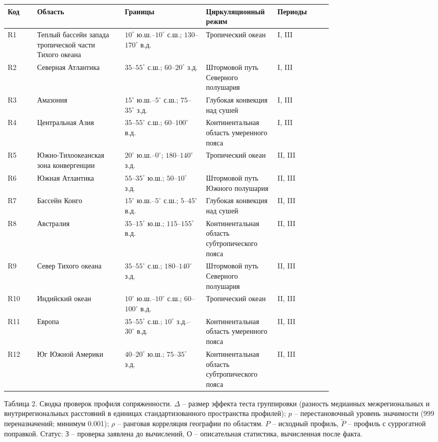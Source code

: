 \documentclass[12pt,a4paper]{article}
\begin{document}
\begin{singlespace}
\noindent\begin{tabular}{@{}l>{\raggedright\arraybackslash}p{0.27\linewidth}>{\raggedright\arraybackslash}p{0.25\linewidth}>{\raggedright\arraybackslash}p{0.22\linewidth}l@{}}
\toprule
Код & Область & Границы & Циркуляционный режим & Периоды\\
\midrule
R1 & Теплый бассейн запада тропической части Тихого океана & $10^\circ$ ю.ш.--$10^\circ$ с.ш.; $130$--$170^\circ$ в.д. & Тропический океан & I, III\\
R2 & Северная Атлантика & $35$--$55^\circ$ с.ш.; $60$--$20^\circ$ з.д. & Штормовой путь Северного полушария & I, III\\
R3 & Амазония & $15^\circ$ ю.ш.--$5^\circ$ с.ш.; $75$--$35^\circ$ з.д. & Глубокая конвекция над сушей & I, III\\
R4 & Центральная Азия & $35$--$55^\circ$ с.ш.; $60$--$100^\circ$ в.д. & Континентальная область умеренного пояса & I, III\\
R5 & Южно-Тихоокеанская зона конвергенции & $20^\circ$ ю.ш.--$0^\circ$; $180$--$140^\circ$ з.д. & Тропический океан & II, III\\
R6 & Южная Атлантика & $55$--$35^\circ$ ю.ш.; $50$--$10^\circ$ з.д. & Штормовой путь Южного полушария & II, III\\
R7 & Бассейн Конго & $15^\circ$ ю.ш.--$5^\circ$ с.ш.; $5$--$45^\circ$ в.д. & Глубокая конвекция над сушей & II, III\\
R8 & Австралия & $35$--$15^\circ$ ю.ш.; $115$--$155^\circ$ в.д. & Континентальная область субтропического пояса & II, III\\
R9 & Север Тихого океана & $35$--$55^\circ$ с.ш.; $180$--$140^\circ$ з.д. & Штормовой путь Северного полушария & II, III\\
R10 & Индийский океан & $10^\circ$ ю.ш.--$10^\circ$ с.ш.; $60$--$100^\circ$ в.д. & Тропический океан & II, III\\
R11 & Европа & $35$--$55^\circ$ с.ш.; $10^\circ$ з.д.--$30^\circ$ в.д. & Континентальная область умеренного пояса & II, III\\
R12 & Юг Южной Америки & $40$--$20^\circ$ ю.ш.; $75$--$35^\circ$ з.д. & Континентальная область субтропического пояса & II, III\\
\bottomrule
\end{tabular}
\end{singlespace}

\clearpage
\noindent Таблица 2. Сводка проверок профиля сопряженности. $\Delta$ -- размер эффекта теста группировки (разность медианных межрегиональных и внутрирегиональных расстояний в единицах стандартизованного пространства профилей); $p$ -- перестановочный уровень значимости (999 переназначений; минимум 0.001); $\rho$ -- ранговая корреляция географии по областям. $P$ -- исходный профиль, $\tilde P$ -- профиль с суррогатной поправкой. Статус: З -- проверка заявлена до вычислений, О -- описательная статистика, вычисленная после факта.
\end{document}
